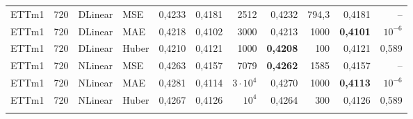{\begin{longtable}{@{}lrll rr rr rr r@{}}
\addlinespace[2pt]
ETTm1 & 720 & DLinear & MSE & 0{,}4233 & 0{,}4181 & 2512 & 0{,}4232 & 794{,}3 & 0{,}4181 & -- \\
ETTm1 & 720 & DLinear & MAE & 0{,}4218 & 0{,}4102 & 3000 & 0{,}4213 & 1000 & \textbf{0{,}4101} & $10^{-6}$ \\
ETTm1 & 720 & DLinear & Huber & 0{,}4210 & 0{,}4121 & 1000 & \textbf{0{,}4208} & 100 & 0{,}4121 & 0{,}589 \\
\addlinespace[2pt]
ETTm1 & 720 & NLinear & MSE & 0{,}4263 & 0{,}4157 & 7079 & \textbf{0{,}4262} & 1585 & 0{,}4157 & -- \\
ETTm1 & 720 & NLinear & MAE & 0{,}4281 & 0{,}4114 & $3\cdot 10^{4}$ & 0{,}4270 & 1000 & \textbf{0{,}4113} & $10^{-6}$ \\
ETTm1 & 720 & NLinear & Huber & 0{,}4267 & 0{,}4126 & $10^{4}$ & 0{,}4264 & 300 & 0{,}4126 & 0{,}589 \\
\addlinespace[2pt]
\bottomrule
\end{longtable}
}
